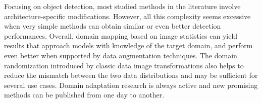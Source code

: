 \documentclass[%
    corpo=12pt,
    twoside,
    stile=classica,   
    tipotesi=magistrale,
    evenboxes,
    english,
	numerazioneromana,
]{toptesi}
\begin{document}
\bigskip
Focusing on object detection, most studied methods in the literature involve architecture-specific modifications. However, all this complexity seems excessive when very simple methods can obtain similar or even better detection performances. Overall, domain mapping based on image statistics can yield results that approach models with knowledge of the target domain, and perform even better when supported by data augmentation techniques. The domain randomization introduced by classic data image transformations also helps to reduce the mismatch between the two data distributions and may be sufficient for several use cases. Domain adaptation research is always active and new promising methods can be published from one day to another.


\backmatter
\english
\printbibliography[heading=bibintoc]
\end{document}
